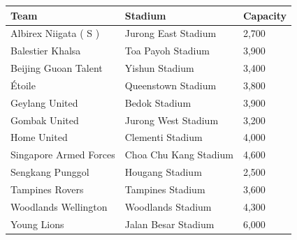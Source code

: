 \documentclass{article}
\begin{document}
\begin{tabular}{lll}
\toprule
Team & Stadium & Capacity \\
\midrule
Albirex Niigata ( S ) & Jurong East Stadium & 2,700 \\
Balestier Khalsa & Toa Payoh Stadium & 3,900 \\
Beijing Guoan Talent & Yishun Stadium & 3,400 \\
Étoile & Queenstown Stadium & 3,800 \\
Geylang United & Bedok Stadium & 3,900 \\
Gombak United & Jurong West Stadium & 3,200 \\
Home United & Clementi Stadium & 4,000 \\
Singapore Armed Forces & Choa Chu Kang Stadium & 4,600 \\
Sengkang Punggol & Hougang Stadium & 2,500 \\
Tampines Rovers & Tampines Stadium & 3,600 \\
Woodlands Wellington & Woodlands Stadium & 4,300 \\
Young Lions & Jalan Besar Stadium & 6,000 \\
\bottomrule
\end{tabular}
\end{document}

